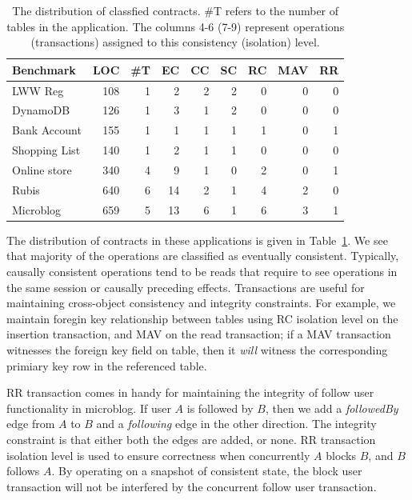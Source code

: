 \begin{table}
\setlength{\tabcolsep}{4pt}
{\sffamily \small
\begin{center}
\begin{tabular} {|l|r|r|r|r|r|r|r|r|}
\hline
{\bf Benchmark} & {\bf LOC} & {\bf \#T} & {\bf EC} & {\bf CC} & {\bf SC} & {\bf RC} & {\bf MAV} & {\bf RR} \\
\hline
{LWW Reg} & 108 & 1 & 2 & 2 & 2 & 0 & 0 & 0 \\
{DynamoDB} & 126 & 1 & 3 & 1 & 2 & 0 & 0 & 0 \\
{Bank Account} & 155 & 1 & 1 & 1 & 1 & 1 & 0 & 1 \\
{Shopping List} & 140 & 1 & 2 & 1 & 1 & 0 & 0 & 0 \\
{Online store} & 340 & 4 & 9 & 1 & 0 & 2 & 0 & 1 \\
{Rubis} & 640 & 6 & 14 & 2 & 1 & 4 & 2 & 0 \\
{Microblog} & 659 & 5 & 13 & 6 & 1 & 6 & 3 & 1 \\
\hline
\end{tabular}
\end{center} }
\caption{The distribution of classfied contracts. \#T refers to the number of
tables in the application. The columns 4-6 (7-9) represent operations
(transactions) assigned to this consistency (isolation) level.}
\label{tab:ctrts}
\end{table}

The distribution of contracts in these applications is given in
Table~\ref{tab:ctrts}. We see that majority of the operations are classified as
eventually consistent. Typically, causally consistent operations tend to be
reads that require to see operations in the same session or causally preceding
effects. Transactions are useful for maintaining cross-object consistency and
integrity constraints. For example, we maintain foregin key relationship
between tables using RC isolation level on the insertion transaction, and MAV
on the read transaction; if a MAV transaction witnesses the foreign key field
on table, then it \emph{will} witness the corresponding primiary key row in the
referenced table.

RR transaction comes in handy for maintaining the integrity of follow user
functionality in microblog. If user $A$ is followed by $B$, then we add a
\emph{followedBy} edge from $A$ to $B$ and a \emph{following} edge in the other
direction. The integrity constraint is that either both the edges are added, or
none. RR transaction isolation level is used to ensure correctness when
concurrently $A$ blocks $B$, and $B$ follows $A$. By operating on a snapshot of
consistent state, the block user transaction will not be interfered by the
concurrent follow user transaction.

